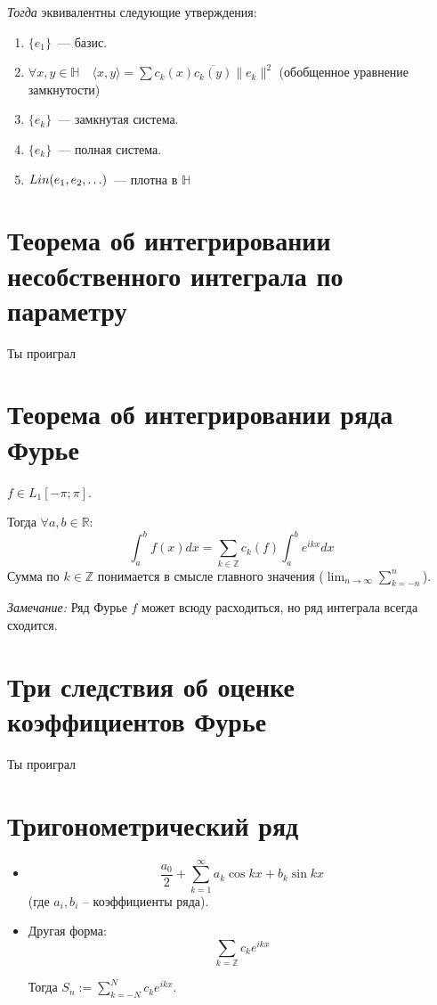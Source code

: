 \documentclass[paper=a4, fontsize=14pt]{article}
\begin{document}
\emph{Тогда} эквивалентны следующие утверждения:
\begin{enumerate}
\item $\{e_1\}$~--- базис.
\item $\forall x, y \in \mathds{H} \quad \langle x, y \rangle = \sum c_k(x)\overline{c_k(y)}\|e_k\|^2$ (обобщенное уравнение замкнутости)
\item $\{e_k\}$~--- замкнутая система.
\item $\{e_k\}$~--- полная система.
\item $Lin(e_1, e_2, \mathellipsis)$~--- плотна в $\mathds{H}$
\end{enumerate}

\section{Теорема об интегрировании несобственного интеграла по параметру}
Ты проиграл

\section{Теорема об интегрировании ряда Фурье}
$f \in L_1[-\pi;\pi]$.

Тогда $\forall a, b \in \mathbb{R}$:
$$\int_a^b f(x)dx = \sum_{k\in\mathbb{Z}} c_k(f) \int_a^b e^{ikx} dx$$
Сумма по $k \in \mathbb{Z}$ понимается в смысле главного значения ($\lim_{n \to \infty} \sum_{k=-n}^n$).

\emph{Замечание:} Ряд Фурье $f$ может всюду расходиться, но ряд интеграла всегда сходится.
\section{Три следствия об оценке коэффициентов Фурье}
Ты проиграл

\section{Тригонометрический ряд}

\begin{itemize}
\item $$ \frac{a_0}{2}  + \sum_{k = 1}^{\infty} a_k\cos kx + b_k\sin kx $$
(где $ a_i, b_i $ -- коэффициенты ряда).

\item Другая форма:	$$ \sum_{k = \mathbb{Z}} c_k e^{ikx} $$

Тогда $ S_n := \sum_{k = -N}^{N} c_k e^{ikx} $.
\end{itemize}
\end{document}
